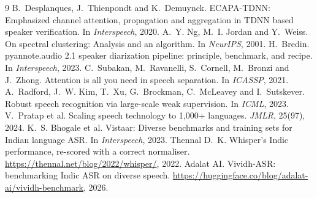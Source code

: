 \documentclass[11pt,a4paper,twocolumn]{article}
\begin{document}
\begin{thebibliography}{9}
\small
{}
B.~Desplanques, J.~Thienpondt and K.~Demuynck.
\newblock ECAPA-TDNN: Emphasized channel attention, propagation and aggregation in TDNN based
speaker verification.
\newblock In \emph{Interspeech}, 2020.
A.~Y. Ng, M.~I. Jordan and Y.~Weiss.
\newblock On spectral clustering: Analysis and an algorithm.
\newblock In \emph{NeurIPS}, 2001.
H.~Bredin.
\newblock pyannote.audio 2.1 speaker diarization pipeline: principle, benchmark, and recipe.
\newblock In \emph{Interspeech}, 2023.
C.~Subakan, M.~Ravanelli, S.~Cornell, M.~Bronzi and J.~Zhong.
\newblock Attention is all you need in speech separation.
\newblock In \emph{ICASSP}, 2021.
A.~Radford, J.~W. Kim, T.~Xu, G.~Brockman, C.~McLeavey and I.~Sutskever.
\newblock Robust speech recognition via large-scale weak supervision.
\newblock In \emph{ICML}, 2023.
V.~Pratap et al.
\newblock Scaling speech technology to 1,000+ languages.
\newblock \emph{JMLR}, 25(97), 2024.
K.~S. Bhogale et al.
\newblock Vistaar: Diverse benchmarks and training sets for Indian language ASR.
\newblock In \emph{Interspeech}, 2023.
Thennal D.~K.
\newblock Whisper's Indic performance, re-scored with a correct normaliser.
\newblock \url{https://thennal.net/blog/2022/whisper/}, 2022.
Adalat AI.
\newblock Vividh-ASR: benchmarking Indic ASR on diverse speech.
\newblock \url{https://huggingface.co/blog/adalat-ai/vividh-benchmark}, 2026.
\end{thebibliography}
\end{document}
